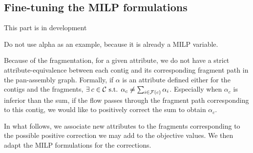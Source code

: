 \subsection{Fine-tuning the MILP formulations}

\begin{warningbox}
  This part is in development
\end{warningbox}

\begin{fixmebox}
  Do not use alpha as an example, because it is already a MILP variable.
\end{fixmebox}
Because of the fragmentation, for a given attribute, we do not have a strict attribute-equivalence between each contig and its corresponding fragment path in the pan-assembly graph.
Formally, if \(\alpha{}\) is an attribute defined either for the contigs and the fragments,
\(\exists c \in \Contigs{} \text{ s.t. } \alpha_c \neq \sum_{i \in \Fragments{}(c)} \alpha_i\).
Especially when \(\alpha_c\) is inferior than the sum, if the flow passes through the fragment path corresponding to this contig, we would like to positively correct the sum to obtain \(\alpha_c\).

In what follows, we associate new attributes to the fragments corresponding to the possible positive correction we may add to the objective values.
We then adapt the MILP formulations for the corrections.


% 